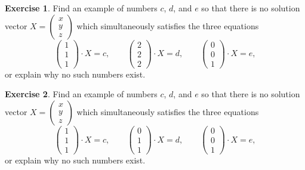 \documentclass[11pt]{amsart}
\theoremstyle{definition}
\newtheorem{exercise}{Exercise}
\begin{document}
\begin{exercise}
Find an example of numbers $c$, $d$, and $e$ so that there is no solution vector $X = \left( \begin{smallmatrix} x \\ y \\ z \end{smallmatrix} \right)$ which simultaneously satisfies the three equations
\begin{equation*}
\begin{pmatrix} 1 \\ 1 \\ 1 \end{pmatrix} \cdot X = c, \qquad
\begin{pmatrix} 2 \\ 2 \\ 2 \end{pmatrix} \cdot X = d, \qquad
\begin{pmatrix} 0 \\ 0 \\ 1 \end{pmatrix} \cdot X = e,
\end{equation*}
or explain why no such numbers exist.
\end{exercise}

\begin{exercise}
Find an example of numbers $c$, $d$, and $e$ so that there is no solution vector $X = \left( \begin{smallmatrix} x \\ y \\ z \end{smallmatrix} \right)$ which simultaneously satisfies the three equations
\begin{equation*}
\begin{pmatrix} 1 \\ 1 \\ 1 \end{pmatrix} \cdot X = c, \qquad
\begin{pmatrix} 0 \\ 1 \\ 1 \end{pmatrix} \cdot X = d, \qquad
\begin{pmatrix} 0 \\ 0 \\ 1 \end{pmatrix} \cdot X = e,
\end{equation*}
or explain why no such numbers exist.
\end{exercise}
\end{document}
